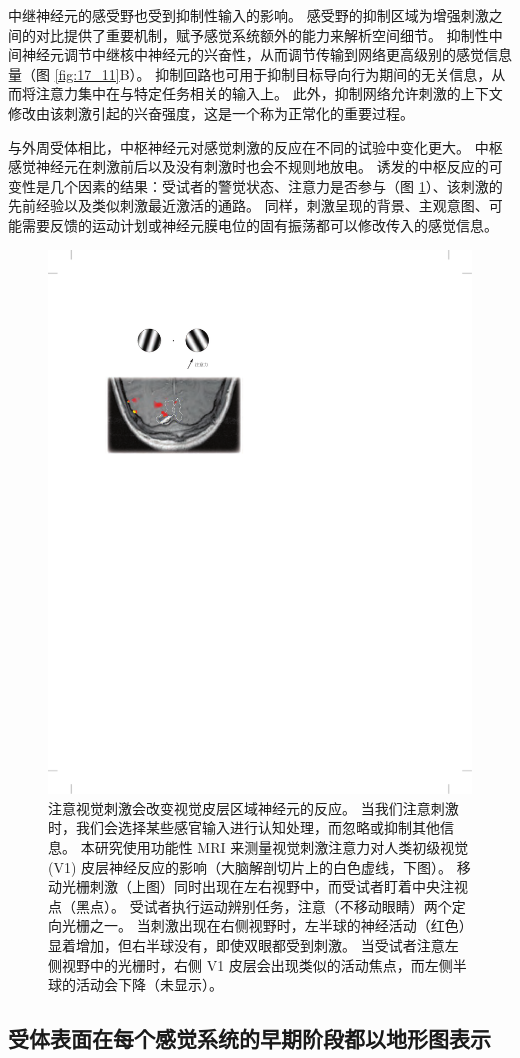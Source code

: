 中继神经元的感受野也受到抑制性输入的影响。 
感受野的抑制区域为增强刺激之间的对比提供了重要机制，赋予感觉系统额外的能力来解析空间细节。 
抑制性中间神经元调节中继核中神经元的兴奋性，从而调节传输到网络更高级别的感觉信息量（图 \ref{fig:17_11}B）。 
抑制回路也可用于抑制目标导向行为期间的无关信息，从而将注意力集中在与特定任务相关的输入上。 
此外，抑制网络允许刺激的上下文修改由该刺激引起的兴奋强度，这是一个称为正常化的重要过程。


与外周受体相比，中枢神经元对感觉刺激的反应在不同的试验中变化更大。 
中枢感觉神经元在刺激前后以及没有刺激时也会不规则地放电。 
诱发的中枢反应的可变性是几个因素的结果：受试者的警觉状态、注意力是否参与（图 \ref{fig:17_12}）、该刺激的先前经验以及类似刺激最近激活的通路。 
同样，刺激呈现的背景、主观意图、可能需要反馈的运动计划或神经元膜电位的固有振荡都可以修改传入的感觉信息。


\begin{figure}[htbp]
	\centering
	\includegraphics[width=0.5\linewidth]{chap17/fig_17_12}
	\caption{注意视觉刺激会改变视觉皮层区域神经元的反应。 
		当我们注意刺激时，我们会选择某些感官输入进行认知处理，而忽略或抑制其他信息。
		本研究使用功能性 MRI 来测量视觉刺激注意力对人类初级视觉 (V1) 皮层神经反应的影响（大脑解剖切片上的白色虚线，下图）。 
		移动光栅刺激（上图）同时出现在左右视野中，而受试者盯着中央注视点（黑点）。 
		受试者执行运动辨别任务，注意（不移动眼睛）两个定向光栅之一。 
		当刺激出现在右侧视野时，左半球的神经活动（红色）显着增加，但右半球没有，即使双眼都受到刺激。 
		当受试者注意左侧视野中的光栅时，右侧 V1 皮层会出现类似的活动焦点，而左侧半球的活动会下降（未显示）\cite{gandhi1999spatial}。}
	\label{fig:17_12}
\end{figure}


\subsection{受体表面在每个感觉系统的早期阶段都以地形图表示}

